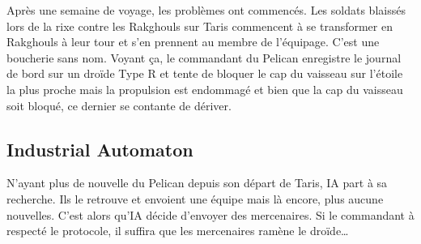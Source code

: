 \documentclass{jdrp}
\begin{document}
Après une semaine de voyage, les problèmes ont commencés. Les soldats blaissés lors de la rixe contre les Rakghouls sur Taris commencent à se transformer en Rakghouls à leur tour et s'en prennent au membre de l'équipage. C'est une boucherie sans nom. Voyant ça, le commandant du Pelican enregistre le journal de bord sur un droïde Type R et tente de bloquer le cap du vaisseau sur l'étoile la plus proche mais la propulsion est endommagé et bien que la cap du vaisseau soit bloqué, ce dernier se contante de dériver.

\subsection{Industrial Automaton}
N'ayant plus de nouvelle du Pelican depuis son départ de Taris, IA part à sa recherche. Ils le retrouve et envoient une équipe mais là encore, plus aucune nouvelles. C'est alors qu'IA décide d'envoyer des mercenaires. Si le commandant à respecté le protocole, il suffira que les mercenaires ramène le droïde\ldots
\end{document}
